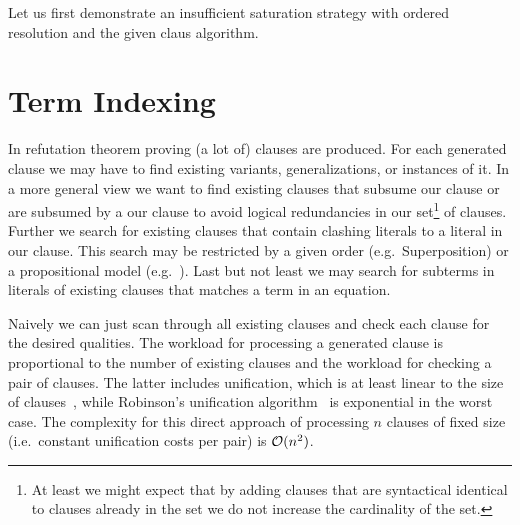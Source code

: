 Let us first demonstrate an insufficient saturation strategy with ordered resolution and the given claus algorithm.

\begin{example}

\end{example}



\section{Term Indexing}








In refutation theorem proving (a lot of) clauses are produced.
For each generated clause we may have to find
existing variants, generalizations, or instances of it.
In a more general view we want to find existing clauses
that subsume our clause or are subsumed by a our clause
to avoid logical redundancies in our set\footnote{
	At least we might expect that by adding clauses
	that are syntactical identical to clauses already in the set
	we do not increase the cardinality of the set.
} of clauses.
Further we search for existing clauses that contain clashing literals to a literal in our clause.
This search may be restricted by a given order (e.g.~Superposition) or a propositional model (e.g.~\InstGenEQ).
Last but not least we may search for subterms in literals of existing clauses that matches a term in an equation.

Naively we can just scan through all existing clauses and check each clause for the desired qualities.
	The workload for processing a generated clause is proportional to the number of existing clauses and
	the workload for checking a pair of clauses.
	The latter includes unification, which is at least linear to the size of clauses~\cite{ALBERT19933},
	while Robinson's unification algorithm~\cite{Robinson:1965:MLB:321250.321253} is exponential in the worst case.
	The complexity for this direct approach of processing \( n \) clauses of fixed size (i.e.~constant unification costs per pair) is \( \mathcal{O}(n^2) \).

